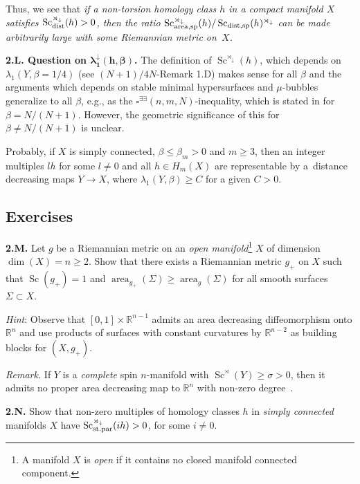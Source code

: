 \documentclass[10pt,a4paper]{amsart}
\numberwithin{equation}{section}
\begin{document}
Thus, we see that
 {\it if a non-torsion homology class $h$ in a compact manifold $X$ satisfies
 $\operatorname{Sc}_{\rm dist}^{\rtimes_\downarrow}(h)>0$, then the ratio
 $\operatorname{Sc}^{\rtimes_\downarrow}_{{\rm area,sp}}(h)/\operatorname{Sc}_{{\rm dist,sp}}(h)^{\rtimes_\downarrow}$
 can be made arbitrarily large with some Riemannian metric on~$X$.}

\textbf{2.L. Question on $\boldsymbol{\lambda^\downarrow_1(h,\beta)}$.} The definition
of $\operatorname{Sc}^{\rtimes_\downarrow}(h)$, which depends on $\lambda_1(Y,\beta=1/4)$
(see $(N + 1)/4N$-Remark 1.D) makes sense for all $\beta$ and the arguments which depends on stable minimal hypersurfaces and $\mu$-bubbles generalize to all $\beta$, e.g., as the $\square^{\exists \exists}(n, m,N)$-inequality, which is stated in \cite[\S2.B]{Gr2023} for $\beta=N/(N+1)$. However, the geometric significance of this for
$\beta\neq N/(N+1)$ is unclear.

Probably, if $X$ is simply connected, $\beta \leq \beta_m>0$ and $m\geq 3$, then an integer multiples
$lh$ for some $l\neq 0$ and all $h\in H_m(X)$ are representable by a~distance decreasing maps $Y\to X$, where $\lambda_1(Y, \beta)\geq C$ for a given $C>0$.

\subsection*{Exercises}

 \textbf{2.M.} Let $g$
be a Riemannian metric on an {\it open manifold}\footnote{A manifold $X$ is \emph{open} if it contains no closed manifold connected component.} $X$ of dimension $\dim(X)=n\geq 2$. Show that there exists a Riemannian metric $g_+$ on $X$ such that $\operatorname{Sc}(g_+)=1$ and $\operatorname{area}_{g_+} (\Sigma)\geq \operatorname{area}_{g} (\Sigma)$ for all smooth surfaces $\Sigma\subset X$.

{\it Hint}: Observe that $[0,1]\times \mathbb R^{n-1}$ admits an area decreasing diffeomorphism onto
$\mathbb R^n$ and
use products of surfaces with constant curvatures by $\mathbb R^{n-2}$ as building blocks for $(X,g_+)$.

 {\it Remark.} If $Y$ is a {\it complete} spin $n$-manifold with $\operatorname{Sc}^\rtimes (Y) \geq \sigma>0$, then it admits no proper area decreasing map to $\mathbb R^n $ with non-zero degree~\cite{GL1983}.

 \textbf {2.N.} Show that non-zero multiples of homology classes $h$ in {\it simply connected} manifolds $X$
 have $\operatorname{Sc}_{{\rm st.par}}^{\rtimes_\downarrow}(ih)>0$, for some $i\neq 0$.
\end{document}
